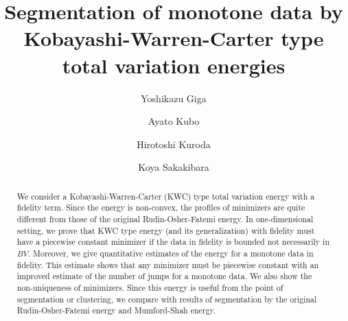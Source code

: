 \documentclass[12pt, reqno]{amsart}
\numberwithin{equation}{section}
\begin{document}
\title[Segmentation of monotone data by KWC]
{Segmentation of monotone data by Kobayashi-Warren-Carter type total variation energies}

\author[Y.~Giga]{Yoshikazu Giga}
\address[Y.~Giga]{Graduate School of Mathematical Sciences, The University of Tokyo, 3-8-1 Komaba, Meguro-ku, Tokyo 153-8914, Japan.}

\author[A.~Kubo]{Ayato Kubo}
\address[A.~Kubo]{Department of Mathematics, Faculty of Science, Hokkaido University, Kita 10, Nishi 8, Kita-Ku, Sapporo, Hokkaido, 060-0810, Japan.}

\author[H.~Kuroda]{Hirotoshi Kuroda}
\address[H.~Kuroda]{Department of Mathematics, Faculty of Science, Hokkaido University, Kita 10, Nishi 8, Kita-Ku, Sapporo, Hokkaido, 060-0810, Japan.}

\author[K.~Sakakibara]{Koya Sakakibara}
\address[K.~Sakakibara]{Faculty of Mathematics and Physics, Institute of Science and Engineering, Kanazawa University, Kakuma-machi, Kanazawa-shi, Ishikawa 920-1192, Japan; 
RIKEN iTHEMS, 2-1 Hirosawa, Wako-shi, Saitama 351-0198, Japan.}


\maketitle
\thispagestyle{empty}


% 
\begin{abstract}
We consider a Kobayashi-Warren-Carter (KWC) type total variation energy with a fidelity term.
 Since the energy is non-convex, the profiles of minimizers are quite different from those of the original Rudin-Osher-Fatemi energy.
 In one-dimensional setting, we prove that KWC type energy (and its generalization) with fidelity must have a piecewise constant minimizer if the data in fidelity is bounded not necessarily in $BV$.
 Moreover, we give quantitative estimates of the energy for a monotone data in fidelity.
 This estimate shows that any minimizer must be piecewise constant with an improved estimate of the number of jumps for a monotone data. 
 We also show the non-uniqueness of minimizers.
 Since this energy is useful from the point of segmentation or clustering, we compare with results of segmentation by the original Rudin-Osher-Fatemi energy and Mumford-Shah energy.
\end{abstract}
\end{document}
